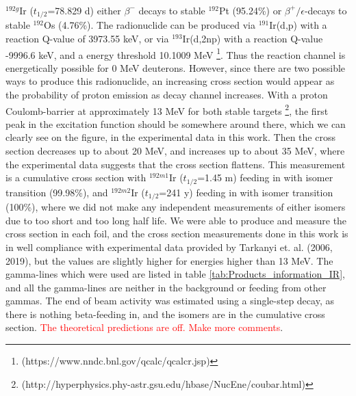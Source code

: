 \documentclass[a4paper,11pt,twoside]{book}
\begin{document}
\subsubsection{}
$^{192g}$Ir ($t_{1/2}$=78.829 d) either $\beta^-$ decays to stable $^{192}$Pt (95.24\%) or $\beta^+/\epsilon$-decays to stable $^{192}$Os (4.76\%). The radionuclide can be produced via $^{191}$Ir(d,p) with a reaction Q-value of 3973.55 keV, or via $^{193}$Ir(d,2np) with a reaction Q-value -9996.6 keV, and a energy threshold 10.1009 MeV \footnote{(https://www.nndc.bnl.gov/qcalc/qcalcr.jsp)}. Thus the reaction channel is energetically possible for 0 MeV deuterons. However, since there are two possible ways to produce this radionuclide, an increasing cross section would appear as the probability of proton emission as decay channel increases. With a proton Coulomb-barrier at approximately 13 MeV for both stable targets \footnote{(http://hyperphysics.phy-astr.gsu.edu/hbase/NucEne/coubar.html)}, the first peak in the excitation function should be somewhere around there, which we can clearly see on the figure, in the experimental data in this work. Then the cross section decreases up to about 20 MeV, and increases up to about 35 MeV, where the experimental data suggests that the cross section flattens. This measurement is a cumulative cross section with $^{192m1}$Ir ($t_{1/2}$=1.45 m) feeding in with isomer transition (99.98\%), and $^{192m2}$Ir ($t_{1/2}$=241 y) feeding in with isomer transition (100\%), where we did not make any independent measurements of either isomers due to too short and too long half life. We were able to produce and measure the cross section in each foil, and the cross section measurements done in this work is in well compliance with experimental data provided by Tarkanyi et. al. (2006, 2019), but the values are slightly higher for energies higher than 13 MeV. The gamma-lines which were used are listed in table \ref{tab:Products_information_IR}, and all the gamma-lines are neither in the background or feeding from other gammas. The end of beam activity was estimated using a single-step decay, as there is nothing beta-feeding in, and the isomers are in the cumulative cross section. \textcolor{red}{The theoretical predictions are off. Make more comments}. 
\end{document}
